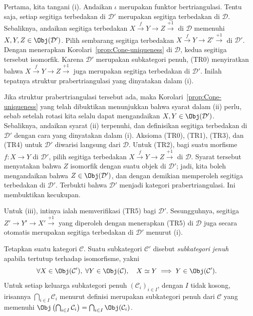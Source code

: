 \begin{bukti}
	Pertama, kita tangani (i). Andaikan $\iota$ merupakan funktor
	bertriangulasi. Tentu saja, setiap segitiga terbedakan di $\mathcal{D}'$
	merupakan segitiga terbedakan di $\mathcal{D}$. Sebaliknya, andaikan
	segitiga terbedakan $X \xrightarrow{f} Y \to Z \xrightarrow{+1}$ di
	$\mathcal{D}$ memenuhi $X, Y, Z \in \Obj(\mathcal{D}')$. Pilih sembarang
	segitiga terbedakan $X \xrightarrow{f} Y \to Z' \xrightarrow{+1}$ di
	$\mathcal{D}'$. Dengan menerapkan Korolari~\ref{prop:Cone-uniqueness} di
	$\mathcal{D}$, kedua segitiga tersebut isomorfik. Karena
	$\mathcal{D}'$ merupakan subkategori penuh, (TR0) menyiratkan bahwa
	$X \xrightarrow{f} Y \to Z \xrightarrow{+1}$ juga merupakan segitiga
	terbedakan di $\mathcal{D}'$. Inilah tepatnya struktur prabertriangulasi yang
	dinyatakan dalam (i).

	Jika struktur prabertriangulasi tersebut ada, maka
	Korolari~\ref{prop:Cone-uniqueness} yang telah dibuktikan menunjukkan bahwa
	syarat dalam (ii) perlu, sebab setelah rotasi kita selalu dapat mengandaikan
	$X, Y \in \Obj(\mathcal{D}')$. Sebaliknya, andaikan syarat (ii) terpenuhi,
	dan definisikan segitiga terbedakan di $\mathcal{D}'$ dengan cara yang
	dinyatakan dalam (i). Aksioma (TR0), (TR1), (TR3), dan (TR4) untuk
	$\mathcal{D}'$ diwarisi langsung dari $\mathcal{D}$. Untuk (TR2), bagi suatu
	morfisme $f: X \to Y$ di $\mathcal{D}'$, pilih segitiga terbedakan
	$X \xrightarrow{f} Y \to Z \xrightarrow{+1}$ di $\mathcal{D}$. Syarat
	tersebut menyatakan bahwa $Z$ isomorfik dengan suatu objek di
	$\mathcal{D}'$; jadi, kita boleh mengandaikan bahwa
	$Z \in \Obj(\mathcal{D}')$, dan dengan demikian memperoleh segitiga
	terbedakan di $\mathcal{D}'$. Terbukti bahwa $\mathcal{D}'$ menjadi kategori
	prabertriangulasi. Ini membuktikan kecukupan.

	Untuk (iii), intinya ialah memverifikasi (TR5) bagi $\mathcal{D}'$.
	Sesungguhnya, segitiga $Z' \to Y' \to X' \xrightarrow{+1}$ yang diperoleh
	dengan menerapkan (TR5) di $\mathcal{D}$ juga secara otomatis merupakan
	segitiga terbedakan di $\mathcal{D}'$ menurut (i).
\end{bukti}

\begin{konvensi}\label{con:saturated-intersection}
	Tetapkan suatu kategori $\mathcal{C}$. Suatu subkategori $\mathcal{C}'$
	disebut \emph{subkategori jenuh} apabila tertutup terhadap isomorfisme,
	yakni
	\[ \forall X \in \Obj(\mathcal{C}'), \; \forall Y \in \Obj(\mathcal{C}), \quad X \simeq Y \implies Y \in \Obj(\mathcal{C}') . \]
	Untuk setiap keluarga subkategori penuh $(\mathcal{C}_i)_{i \in I}$, dengan
	$I$ tidak kosong, irisannya $\bigcap_{i \in I} \mathcal{C}_i$ menurut
	definisi merupakan subkategori penuh dari $\mathcal{C}$ yang memenuhi
	$\Obj\left( \bigcap_{i \in I} \mathcal{C}_i \right)
	= \bigcap_{i \in I} \Obj(\mathcal{C}_i)$.
\end{konvensi}

